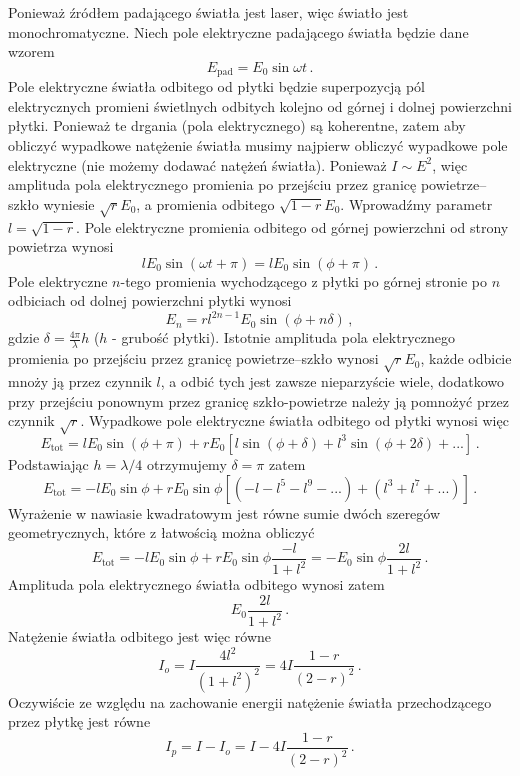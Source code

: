 \documentclass[../main.tex]{subfiles}
\begin{document}
Ponieważ źródłem padającego światła jest laser, więc światło jest monochromatyczne. Niech pole
elektryczne padającego światła będzie dane wzorem
\begin{equation*}
    E_\text{pad}=E_0\sin \omega t\,.
\end{equation*}
Pole elektryczne światła odbitego od płytki będzie superpozycją pól elektrycznych promieni
świetlnych odbitych kolejno od górnej i dolnej powierzchni płytki. Ponieważ te drgania (pola
elektrycznego) są koherentne, zatem aby obliczyć wypadkowe natężenie światła musimy najpierw
obliczyć wypadkowe pole elektryczne (nie możemy dodawać natężeń światła). Ponieważ \(I\sim E^2\),
więc amplituda pola elektrycznego promienia po przejściu przez granicę powietrze--szkło wyniesie
\(\sqrt{r}E_0\), a promienia odbitego \(\sqrt{1-r}E_0\). Wprowadźmy parametr \(l=\sqrt{1-r}\). Pole
elektryczne promienia odbitego od górnej powierzchni od strony powietrza wynosi
\begin{equation*}
    lE_0\sin(\omega t+\pi)=lE_0\sin(\phi+\pi)\,.
\end{equation*}
Pole elektryczne \(n\)-tego promienia wychodzącego z płytki po górnej stronie po \(n\) odbiciach od
dolnej powierzchni płytki wynosi
\begin{equation*}
    E_n=rl^{2n-1}E_0\sin(\phi+n\delta)\,,
\end{equation*}
gdzie \(\delta=\frac{4\pi}{\lambda}h\) (\(h\) - grubość płytki). Istotnie amplituda pola
elektrycznego promienia po przejściu przez granicę powietrze--szkło wynosi \(\sqrt{r}E_0\), każde
odbicie mnoży ją przez czynnik \(l\), a odbić tych jest zawsze nieparzyście wiele, dodatkowo przy
przejściu ponownym przez granicę szkło-powietrze należy ją pomnożyć przez czynnik \(\sqrt{r}\).
Wypadkowe pole elektryczne światła odbitego od płytki wynosi więc
\begin{equation*}
    E_\text{tot}=lE_0\sin(\phi+\pi)+rE_0\left[l\sin(\phi+\delta)+l^3\sin(\phi+2\delta)+...\right]\,.
\end{equation*}
Podstawiając \(h=\lambda/4\) otrzymujemy \(\delta=\pi\) zatem
\begin{equation*}
    E_\text{tot}=-lE_0\sin\phi+rE_0\sin\phi\left[(-l-l^5-l^9-...)+(l^3+l^7+...)\right]\,.
\end{equation*}
Wyrażenie w nawiasie kwadratowym jest równe sumie dwóch szeregów geometrycznych, które z łatwością
można obliczyć
\begin{equation*}
    E_\text{tot}=-lE_0\sin\phi+rE_0\sin\phi\frac{-l}{1+l^2}=-E_0\sin\phi \frac{2l}{1+l^2}\,.
\end{equation*}
Amplituda pola elektrycznego światła odbitego wynosi zatem
\begin{equation*}
    E_0\frac{2l}{1+l^2}\,.
\end{equation*}
Natężenie światła odbitego jest więc równe
\begin{equation*}
    I_{o}=I\frac{4l^2}{(1+l^2)^2}=4I\frac{1-r}{(2-r)^2}\,.
\end{equation*}
Oczywiście ze względu na zachowanie energii natężenie światła przechodzącego przez płytkę jest równe
\begin{equation*}
    I_p=I-I_o=I-4I\frac{1-r}{(2-r)^2}\,.
\end{equation*}
\end{document}
